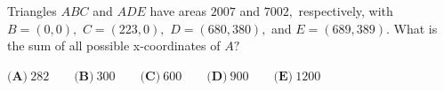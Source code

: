 Triangles $ ABC$ and $ ADE$ have areas $ 2007$ and $ 7002,$ respectively, with $ B = (0,0),$ $ C = (223,0),$ $ D = (680,380),$ and $ E = (689,389).$ What is the sum of all possible x-coordinates of $ A?$



$ \textbf{(A)}\ 282 \qquad \textbf{(B)}\ 300 \qquad \textbf{(C)}\ 600 \qquad \textbf{(D)}\ 900 \qquad \textbf{(E)}\ 1200$
